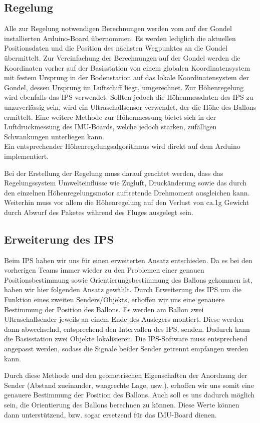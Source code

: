 \documentclass[lang=ngerman,inputenc=utf8,fontsize=10pt]{ldvarticle}
\begin{document}
\subsection*{Regelung}
Alle zur Regelung notwendigen Berechnungen werden vom auf der Gondel installierten Arduino-Board übernommen. Es werden lediglich die aktuellen Positionsdaten und die Position des nächsten Wegpunktes an die Gondel übermittelt. Zur Vereinfachung der Berechnungen auf der Gondel werden die Koordinaten vorher auf der Basisstation von einem globalen Koordinatensystem mit festem Ursprung in der Bodenstation auf das lokale Koordinatensystem der Gondel, dessen Ursprung  im Luftschiff liegt, umgerechnet. Zur Höhenregelung wird ebenfalls das IPS verwendet. Sollten jedoch die Höhenmessdaten des IPS zu unzuverlässig sein, wird ein Ultraschallsensor verwendet, der die Höhe des Ballons ermittelt. Eine weitere Methode zur Höhenmessung bietet sich in der Luftdruckmessung des IMU-Boards, welche jedoch starken, zufälligen Schwankungen unterliegen kann.\\ Ein entsprechender Höhenregelungsalgorithmus wird direkt auf dem Arduino implementiert.


Bei der Erstellung der Regelung muss darauf geachtet werden, dass das Regelungssystem Umwelteinflüsse wie Zugluft, Druckänderung sowie das durch den einzelnen Höhenregelungsmotor auftretende Drehmoment ausgleichen kann. Weiterhin muss vor allem die Höhenregelung auf den Verlust von ca.1g Gewicht durch Abwurf des Paketes während des Fluges ausgelegt sein.


\subsection*{Erweiterung des IPS}
Beim IPS haben wir uns für einen erweiterten Ansatz entschieden. Da es bei den vorherigen Teams immer wieder zu den Problemen einer genauen Positionsbestimmung sowie Orientierungsbestimmung des Ballons gekommen ist, haben wir hier folgenden Ansatz gewählt.
Durch Erweiterung des IPS um die Funktion eines zweiten Senders/Objekts, erhoffen wir uns eine genauere Bestimmung der Position des Ballons. Es werden am Ballon zwei Ultraschallsender jeweils an einem Ende des Auslegers montiert. Diese werden dann abwechselnd, entsprechend den Intervallen des IPS, senden. Dadurch kann die Basisstation zwei Objekte lokalisieren. Die IPS-Software muss entsprechend angepasst werden, sodass die Signale beider Sender getrennt empfangen werden kann.

Durch diese Methode und den geometrischen Eigenschaften der Anordnung der Sender (Abstand zueinander, waagrechte Lage, usw.), erhoffen wir uns somit eine genauere Bestimmung der Position des Ballons. Auch soll es uns dadurch möglich sein, die Orientierung des Ballons berechnen zu können. Diese Werte können dann unterstützend, bzw. sogar ersetzend für das IMU-Board dienen.
\end{document}
